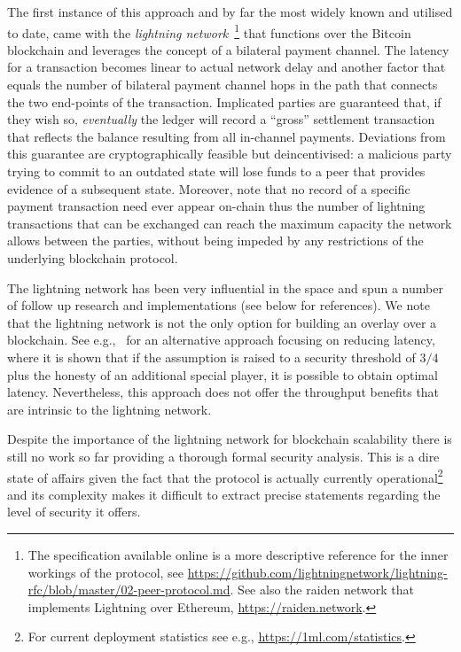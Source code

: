 The first instance of this approach and by far the most widely known and
utilised to date, came with the \emph{lightning
network}~\cite{lightning}\footnote{The specification available online is a more
descriptive reference for the inner workings of the protocol, see
\url{https://github.com/lightningnetwork/lightning-rfc/blob/master/02-peer-protocol.md}.
See also the raiden network that implements Lightning over Ethereum,
\url{https://raiden.network}.} that functions over the Bitcoin blockchain and
leverages the concept of a bilateral payment channel. The latency for a
transaction becomes linear to actual network delay and another factor that
equals the number of bilateral payment channel hops in the path that connects
the two end-points of the transaction. Implicated parties are guaranteed that,
if they wish so, \emph{eventually} the ledger will record a ``gross'' settlement
transaction that reflects the balance resulting from all in-channel payments.
Deviations from this guarantee are cryptographically feasible but
deincentivised: a malicious party trying to commit to an outdated state will
lose funds to a peer that provides evidence of a subsequent state. Moreover,
note that no record of a specific payment transaction need ever appear on-chain
thus the number of lightning transactions that can be exchanged can reach the
maximum capacity the network allows between the parties, without being impeded
by any restrictions of the underlying blockchain protocol.

The lightning network has been very influential in the space and spun a number
of follow up research and implementations (see below for references). We note
that the lightning network is not the only option for building an overlay over a
blockchain. See e.g.,~\cite{DBLP:conf/eurocrypt/PassS18} for an alternative
approach focusing on reducing latency, where it is shown that if the assumption
is raised to a security threshold of $3/4$ plus the honesty of an additional
special player, it is possible to obtain optimal latency. Nevertheless, this
approach does not offer the throughput benefits that are intrinsic to the
lightning network.

Despite the importance of the lightning network for blockchain scalability there
is still no work so far providing a thorough formal security analysis. This is a
dire state of affairs given the fact that the protocol is actually currently
operational\footnote{For current deployment statistics see e.g.,
\url{https://1ml.com/statistics}.} and its complexity makes it difficult to
extract precise statements regarding the level of security it offers.

